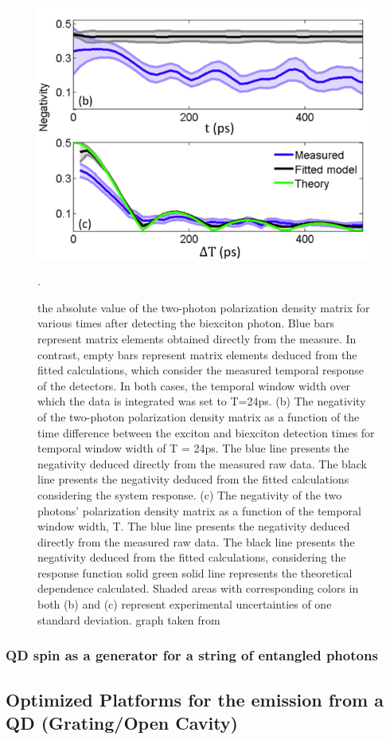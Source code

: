  \begin{figure}[H]
	\centering
	\includegraphics[scale=0.9]{figures/Entanglement_Integration.png}
	\caption{the absolute value of the two-photon polarization density matrix for various times after detecting the biexciton photon. Blue bars represent matrix elements obtained directly from the measure. In contrast, empty bars represent matrix elements deduced from the fitted calculations, which consider the measured temporal response of the detectors. In both cases, the temporal window width over which the data is integrated was set to T=24ps. (b) The negativity of the two-photon polarization density matrix as a function of the time difference between the exciton and biexciton detection times for temporal window width of T = 24ps. The blue line presents the negativity deduced directly from the measured raw data. The black line presents the negativity deduced from the fitted calculations considering the system response. (c) The negativity of the two photons' polarization density matrix as a function of the temporal window width, T. The blue line presents the negativity deduced directly from the measured raw data. The black line presents the negativity deduced from the fitted calculations, considering the response function solid green solid line represents the theoretical dependence calculated. Shaded areas with corresponding colors in both (b) and (c) represent experimental uncertainties of one standard deviation. graph taken from \cite{Winik2017}}.
\end{figure}
\subsubsection{QD spin as a generator for a string of entangled photons}

\subsection{Optimized Platforms for the emission from a QD (Grating/Open Cavity)}

